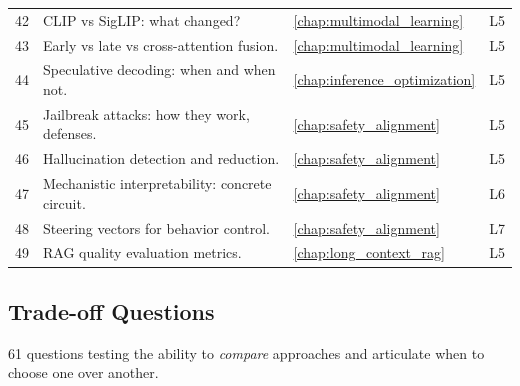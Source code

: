 \begin{longtable}{rp{8.5cm}ll}
42 & CLIP vs SigLIP: what changed? & \ref{chap:multimodal_learning} & L5 \\
43 & Early vs late vs cross-attention fusion. & \ref{chap:multimodal_learning} & L5 \\
44 & Speculative decoding: when and when not. & \ref{chap:inference_optimization} & L5 \\
45 & Jailbreak attacks: how they work, defenses. & \ref{chap:safety_alignment} & L5 \\
46 & Hallucination detection and reduction. & \ref{chap:safety_alignment} & L5 \\
47 & Mechanistic interpretability: concrete circuit. & \ref{chap:safety_alignment} & L6 \\
48 & Steering vectors for behavior control. & \ref{chap:safety_alignment} & L7 \\
49 & RAG quality evaluation metrics. & \ref{chap:long_context_rag} & L5 \\
\end{longtable}

\subsection{Trade-off Questions}

61 questions testing the ability to \textit{compare} approaches and articulate when to choose one over another.

